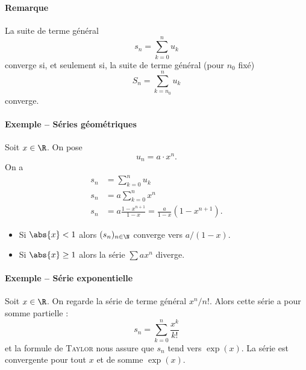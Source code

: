 \documentclass{livre}
\begin{document}
\paragraph{Remarque}La suite de terme général \[ s_n = \sum_{k=0}^{n}u_k\] converge si, et seulement si, la suite de terme général (pour $n_0$ fixé) \[ S_n = \sum_{k=n_0}^{n}u_k\]converge.



\paragraph{Exemple -- Séries géométriques}Soit $x\in \R$. On pose \[ u_n = a\cdot x^{n}.\]On a 
\begin{align*}
s_n &= \sum_{k=0}^{n}u_k\\
s_n &= a\sum_{k=0}^{n}x^{n}\\
s_n &= a\frac{1-x^{n+1}}{1-x} = \frac{a}{1-x}(1-x^{n+1}).
\end{align*}
\begin{itemize}
\item Si $\abs{x}<1$ alors $(s_n)_{n\in\N}$ converge vers $a/(1-x)$.
\item Si $\abs{x}\geq 1$ alors la série $\sum ax^{n}$ diverge.
\end{itemize}
\paragraph{Exemple -- Série exponentielle}Soit $x\in \R$. On regarde la série de terme général $x^{n}/n!$. Alors cette série a pour somme partielle : \[s_n = \sum_{k=0}^{n}\frac{x^{k}}{k!}\]et la formule de \textsc{Taylor} nous assure que $s_n$ tend vers $\exp(x)$. La série est convergente pour tout $x$ et de somme $\exp(x)$.
\end{document}
